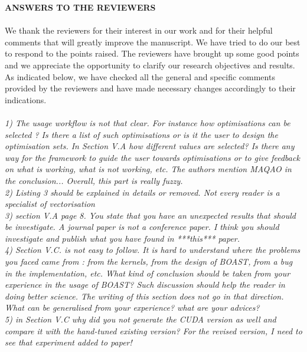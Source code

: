 \documentclass[10pt]{article}
\begin{document}
\noindent
{\Large\bf ANSWERS TO THE REVIEWERS}\\~\\

We thank the  reviewers for their interest in our work and for their helpful comments that will greatly improve  the manuscript. We have  tried  to do  our  best to  respond to  the  points  raised. The reviewers have brought  up  some  good  points  and  we  appreciate  the  opportunity  to  clarify  our research objectives and results. As  indicated  below,  we  have  checked  all  the  general  and  specific  comments  provided  by  the reviewers and have made necessary changes accordingly to their indications.\\

\\

\noindent
{\em 1) The usage workflow is not that clear. For instance how optimisations can be selected ? Is there a list of such optimisations or is it the user
  to design the optimisation sets. In Section V.A how different values are selected? Is there any way for the framework to guide the user towards
  optimisations or to give feedback on what is working, what is not working, etc. The authors mention MAQAO in the conclusion... Overall, this part is
  really fuzzy.}\\

\noindent
{\em 2) Listing 3 should be explained in details or removed. Not every reader is a specialist of vectorisation}\\

\noindent
{\em 3) section V.A page 8. You state that you have an unexpected results that should be investigate. A journal paper is not a conference paper. I think you should investigate and publish what you have found in ***this*** paper.} \\

\noindent
{\em 4) Section V.C. is not easy to follow. It is hard to understand where the problems you faced came from : from the kernels, from the design of BOAST, from a bug in the implementation, etc. What kind of conclusion should be taken from your experience in the usage of BOAST? Such discussion should help the reader in doing better science. The writing of this section does not go in that direction. What can be generalised from your experience? what are your advices?}\\

\noindent
{\em 5) in Section V.C why did you not generate the CUDA version as well and compare it with the hand-tuned existing version? For the revised version, I need to see that experiment added to paper!}\\ 
\end{document}
